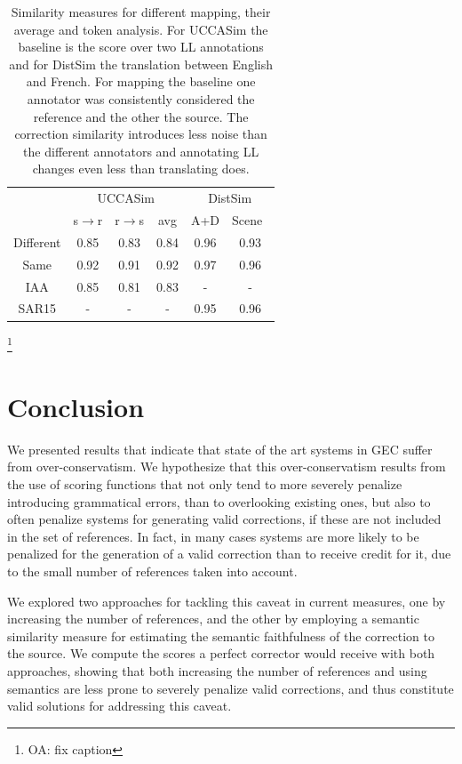\documentclass[letter,11pt]{article}
\newcommand{\oa}[1]{\footnote{\color{red}OA: #1}}
\begin{document}
\begin{table}[h!]
  \centering
  \singlespacing
  \begin{tabular}{c|c|c|c||c|c|}
  	\cline{2-6} 
  	& \multicolumn{3}{c||}{\sc UCCASim} & \multicolumn{2}{c|}{\sc DistSim}\\ \cline{2-6}
  	& s$\rightarrow$r & r$\rightarrow$s & avg & A+D & Scene\
    \\
    \hline
    Different & 0.85 & 0.83 & 0.84 & 0.96 & 0.93
    \\
    Same & 0.92 & 0.91 & 0.92 & 0.97 & 0.96
    \\
    \hline
    \hline
    IAA & 0.85 & 0.81 & 0.83 & - & -
    \\
    \hline
    SAR15 & - & - & - & 0.95 & 0.96 \\
    \hline
  \end{tabular}
  \caption{Similarity measures for different mapping, their average and token analysis. For {\sc UCCASim} the baseline is the score over two LL annotations and for {\sc DistSim} the translation between English and French. For mapping the baseline one annotator was consistently considered the reference and the other the source. The correction similarity introduces less noise than the different annotators and annotating LL changes even less than translating does.\label{tab:Distances}}
\end{table}
\oa{fix caption}


\section{Conclusion}

We presented results that indicate that state of the art systems in GEC suffer from over-conservatism. We hypothesize that this over-conservatism results from the use of scoring functions that not only tend to more severely penalize introducing grammatical errors, than to overlooking existing ones, but also to often penalize systems for generating valid corrections, if these are not included in the set of references.
In fact, in many cases systems are more likely to be penalized for the generation of
a valid correction than to receive credit for it, due to the small number of references
taken into account.

We explored two approaches for tackling this caveat in current measures, one by
increasing the number of references, and the other by employing a semantic similarity
measure for estimating the semantic faithfulness of the correction to the source.
We compute the scores a perfect corrector would receive with both approaches, showing that both increasing the number of references and using semantics are less prone to severely penalize valid corrections, and thus constitute valid solutions for addressing this caveat.
\end{document}
